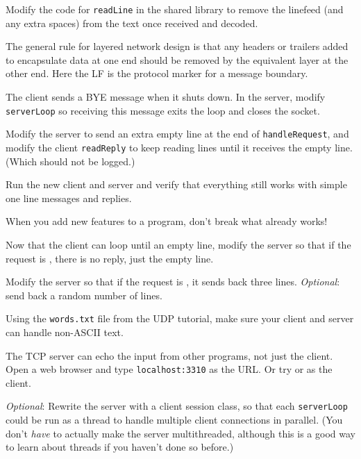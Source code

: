 Modify the code for \texttt{readLine} in the shared library to remove the
linefeed (and any extra spaces) from the text once received and decoded.

\begin{IMPORTANT}
The general rule for layered network design is that any headers or trailers
added to encapsulate data at one end should be removed by the equivalent
layer at the other end. Here the LF is the protocol marker for a message
boundary.
\end{IMPORTANT}

\STEP
The client sends a BYE message when it shuts down. In the server, modify
\texttt{serverLoop}
so receiving this message exits the loop and closes the socket.

\STEP
Modify the server to send an extra empty line at the end of \texttt{handleRequest},
and modify the client \texttt{readReply} to keep reading lines until it receives
the empty line. (Which should not be logged.)

Run the new client and server and verify that everything still works with
simple one line messages and replies.

\begin{IMPORTANT}
When you add new features to a program, don't break what already works!
\end{IMPORTANT}

\STEP
Now that the client can loop until an empty line, modify the server so
that if the request is , there is no reply, just the empty line.

\STEP
Modify the server so that if the request is , it sends back three
lines. \emph{Optional}: send back a random number of lines.



\STEP Using the \texttt{words.txt} file from the UDP tutorial, make sure
your client and server can handle non-ASCII text.

The TCP server can echo the input from other programs, not just the client.
Open a web browser and type \texttt{localhost:3310} as the URL.
Or try  or  as the client. 

\emph{Optional}: Rewrite the server with a client session class, so that
each \texttt{serverLoop}
could be run as a thread to handle multiple client connections in parallel.
(You don't \emph{have} to actually make the server multithreaded, although
this is a good way to learn about threads if you haven't done so before.)


\COPYRIGHT


